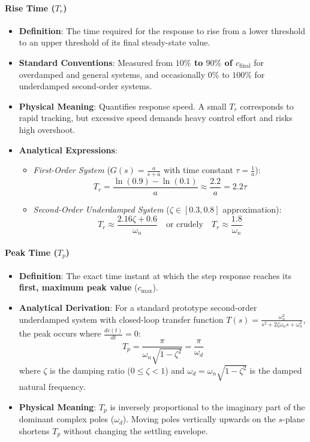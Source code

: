 \documentclass[12pt,onecolumn,twoside ]{article}
\begin{document}
	\paragraph{Rise Time ($T_r$)}
	\begin{itemize}
		\item
		\textbf{Definition}: The time required for the response to rise from a lower threshold to an upper threshold of its final steady-state value.
		\item
		\textbf{Standard Conventions}: Measured from \textbf{$10\%$ to $90\%$ of $c_{\text{final}}$} for overdamped and general systems, and occasionally $0\%$ to $100\%$ for underdamped second-order systems.
		\item
		\textbf{Physical Meaning}: Quantifies response speed. A small $T_r$ corresponds to rapid tracking, but excessive speed demands heavy control effort and risks high overshoot.
		\item
		\textbf{Analytical Expressions}:
		\begin{itemize}
			\item
			\textit{First-Order System} ($G(s) = \frac{a}{s+a}$ with time constant $\tau = \frac{1}{a}$): \[
			T_r = \frac{\ln(0.9) - \ln(0.1)}{a} \approx \frac{2.2}{a} = 2.2\tau
			\]
			\item
			\textit{Second-Order Underdamped System} ($\zeta \in [0.3, 0.8]$ approximation): \[
			T_r \approx \frac{2.16\zeta + 0.6}{\omega_n} \quad \text{or crudely} \quad T_r \approx \frac{1.8}{\omega_n}
			\]
		\end{itemize}
	\end{itemize}
	\paragraph{Peak Time ($T_p$)}
	\begin{itemize}
		\item
		\textbf{Definition}: The exact time instant at which the step response reaches its \textbf{first, maximum peak value} ($c_{\text{max}}$).
		\item
		\textbf{Analytical Derivation}: For a standard prototype second-order underdamped system with closed-loop transfer function $T(s) = \frac{\omega_n^2}{s^2 + 2\zeta\omega_n s + \omega_n^2}$, the peak occurs where $\frac{dc(t)}{dt} = 0$: \[
		T_p = \frac{\pi}{\omega_n \sqrt{1 - \zeta^2}} = \frac{\pi}{\omega_d}
		\] where $\zeta$ is the damping ratio ($0 \le \zeta < 1$) and $\omega_d = \omega_n \sqrt{1 - \zeta^2}$ is the damped natural frequency.
		\item
		\textbf{Physical Meaning}: $T_p$ is inversely proportional to the imaginary part of the dominant complex poles ($\omega_d$). Moving poles vertically upwards on the $s$-plane shortens $T_p$ without changing the settling envelope.
	\end{itemize}
\end{document}

